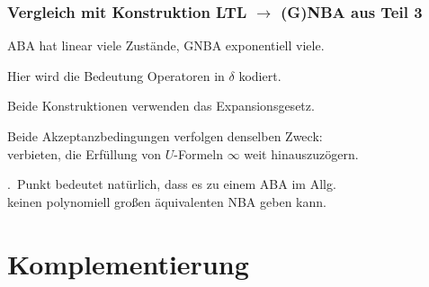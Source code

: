   \begin{frame}
    \frametitle{Vergleich mit Konstruktion LTL $\to$ (G)NBA aus Teil 3}
    
    \begin{Itemize}
      \item
        ABA hat linear viele Zustände, GNBA exponentiell viele.
      \item
        Hier wird die Bedeutung  Operatoren in $\delta$ kodiert.
    \end{Itemize}

    \parI    
    \begin{Itemize}
      \item
        Beide Konstruktionen verwenden das Expansionsgesetz.
      \item
        Beide Akzeptanzbedingungen verfolgen denselben Zweck: \\
        verbieten, die Erfüllung von $U$-Formeln $\infty$ weit hinauszuzögern.
    \end{Itemize}

    .\ Punkt bedeutet natürlich, dass es zu einem ABA im Allg. \\
    keinen polynomiell großen äquivalenten NBA geben kann.
    

  \end{frame}

  \section{Komplementierung}

